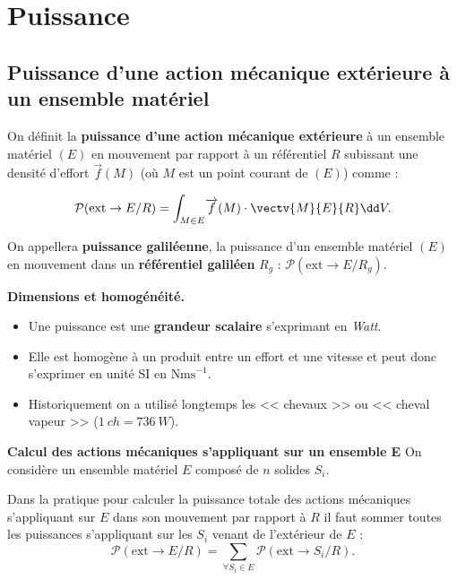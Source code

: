 \section{Puissance}
\subsection{Puissance d'une action mécanique extérieure à un ensemble matériel}
\begin{defi}%
On définit la \textbf{puissance d'une action mécanique extérieure} à un ensemble matériel $(E)$ en mouvement par rapport à un référentiel $R$ subissant une densité d'effort $\overrightarrow{f}(M)$ (où $M$ est un point courant de $(E)$) comme :

$$
\mathcal{P}(\text{ext} \rightarrow E/R)=\displaystyle{\int_{M\in E}}\overrightarrow{f}(M)\cdot \vectv{M}{E}{R}%
\dd V.
$$
\end{defi}

\begin{rem}%
On appellera \textbf{puissance galiléenne}, la puissance d'un ensemble matériel $(E)$ en mouvement dans un \textbf{référentiel galiléen} $R_g$ : 
$
\mathcal{P}(\text{ext} \rightarrow E/R_g)
$.
\end{rem}%


\begin{warn}\textbf{Dimensions et homogénéité.}
\begin{itemize}
\item Une puissance est une \textbf{grandeur scalaire} s'exprimant en \textit{Watt}.
\item Elle est homogène à un produit entre un effort et une vitesse et peut donc s'exprimer en unité SI en $\text{Nms}^{-1}$.
\item Historiquement on a utilisé longtemps les << chevaux >> ou << cheval vapeur >> ($\SI{1}{ch}= \SI{736}{W}$).
\end{itemize}

\end{warn}

\begin{prop}\textbf{Calcul des actions mécaniques s'appliquant sur un ensemble E}
On considère un ensemble matériel $E$ composé de $n$ solides $S_i$. 

Dans la pratique pour calculer la puissance totale des actions mécaniques s'appliquant sur $E$ dans son mouvement par rapport à $R$ il faut sommer toutes les puissances s'appliquant sur les $S_i$ venant de l'extérieur de $E$ :
$$
\mathcal{P}(\text{ext} \rightarrow E/R)=\displaystyle{\sum_{\forall S_i \in E}\mathcal{P}(\text{ext} \rightarrow S_i/R)}.
$$
\end{prop}

